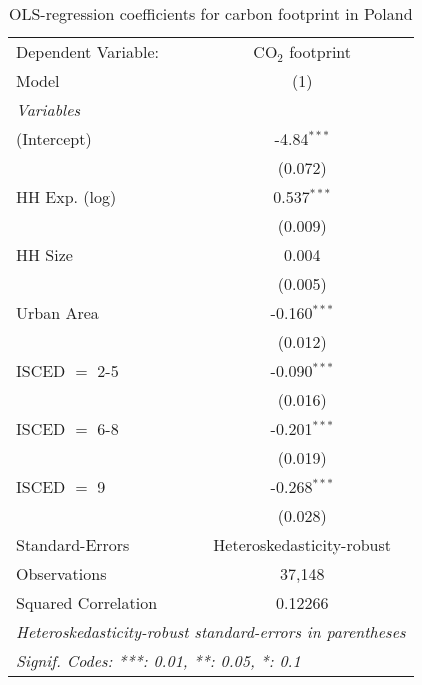
\begin{table}[htbp!]
   \centering
   \small
   \begin{adjustbox}{width = 1\textwidth, max height = 0.95\textheight, center}
      \begin{threeparttable}[b]
         \caption{\label{tab:OLS_2_POL} OLS-regression coefficients for carbon footprint in Poland}
         \begin{tabular}{lc}
            \tabularnewline \midrule \midrule
            Dependent Variable: & CO$_{2}$ footprint\\  
            Model               & (1)\\  
            \midrule
            \emph{Variables}\\
            (Intercept)         & -4.84$^{***}$\\   
                                & (0.072)\\   
            HH Exp. (log)       & 0.537$^{***}$\\   
                                & (0.009)\\   
            HH Size             & 0.004\\   
                                & (0.005)\\   
            Urban Area          & -0.160$^{***}$\\   
                                & (0.012)\\   
            ISCED $=$ 2-5       & -0.090$^{***}$\\   
                                & (0.016)\\   
            ISCED $=$ 6-8       & -0.201$^{***}$\\   
                                & (0.019)\\   
            ISCED $=$ 9         & -0.268$^{***}$\\   
                                & (0.028)\\   
            \midrule 
            Standard-Errors     & Heteroskedasticity-robust \\   
            Observations        & 37,148\\  
            Squared Correlation & 0.12266\\  
            \midrule \midrule
            \multicolumn{2}{l}{\emph{Heteroskedasticity-robust standard-errors in parentheses}}\\
            \multicolumn{2}{l}{\emph{Signif. Codes: ***: 0.01, **: 0.05, *: 0.1}}\\
         \end{tabular}
         

\end{threeparttable}
\end{adjustbox}
\end{table}
